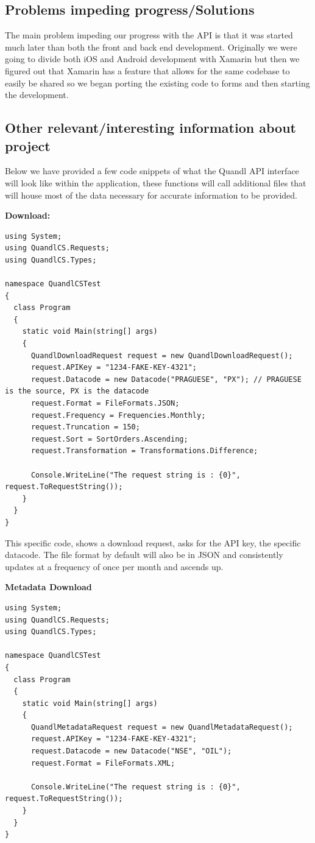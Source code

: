 \documentclass[letterpaper,10pt,titlepage,journal,compsoc,draftclsnofoot,onecolumn]{IEEEtran}
\begin{document}
\subsection{Problems impeding progress/Solutions}

The main problem impeding our progress with the API is that it was started much later than both the front and back end development. Originally we were going to divide both iOS and Android development with Xamarin but then we figured out that Xamarin has a feature that allows for the same codebase to easily be shared so we began porting the existing code to forms and then starting the development. 

\subsection{Other relevant/interesting information about project}

Below we have provided a few code snippets of what the Quandl API interface will look like within the application, these functions will call additional files that will house most of the data necessary for accurate information to be provided. 

 \textbf{Download:} 
\begin{lstlisting}
using System;
using QuandlCS.Requests;
using QuandlCS.Types;

namespace QuandlCSTest
{
  class Program
  {
    static void Main(string[] args)
    {
      QuandlDownloadRequest request = new QuandlDownloadRequest();
      request.APIKey = "1234-FAKE-KEY-4321";
      request.Datacode = new Datacode("PRAGUESE", "PX"); // PRAGUESE is the source, PX is the datacode
      request.Format = FileFormats.JSON;
      request.Frequency = Frequencies.Monthly;
      request.Truncation = 150;
      request.Sort = SortOrders.Ascending;
      request.Transformation = Transformations.Difference;

      Console.WriteLine("The request string is : {0}", request.ToRequestString());
    }
  }
}
\end{lstlisting}

This specific code, shows a download request, asks for the API key, the specific datacode. The file format by default will also be in JSON and consistently updates at a frequency of once per month and ascends up. 

\textbf{Metadata Download}

\begin{lstlisting}
using System;
using QuandlCS.Requests;
using QuandlCS.Types;

namespace QuandlCSTest
{
  class Program
  {
    static void Main(string[] args)
    {
      QuandlMetadataRequest request = new QuandlMetadataRequest();
      request.APIKey = "1234-FAKE-KEY-4321";
      request.Datacode = new Datacode("NSE", "OIL");      
      request.Format = FileFormats.XML;

      Console.WriteLine("The request string is : {0}", request.ToRequestString());
    }
  }
}
\end{lstlisting}
\end{document}
